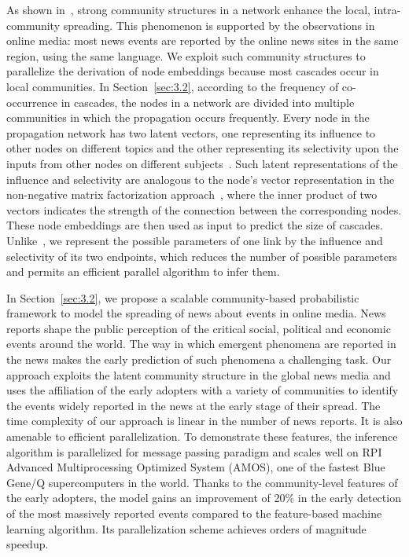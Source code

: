 As shown in~\cite{nematzadeh2014optimal}, strong community structures in a network enhance the local, intra-community spreading. This phenomenon is supported by the observations in online media: most news events are reported by the online news sites in the same region, using the same language. We exploit such community structures to parallelize the derivation of node embeddings because most cascades occur in local communities. In Section~\ref{sec:3.2}, according to the frequency of co-occurrence in cascades, the nodes in a network are divided into multiple communities in which the propagation occurs frequently. Every node in the propagation network has two latent vectors, one representing its influence to other nodes on different topics and the other representing its selectivity upon the inputs from other nodes on different subjects~\cite{bogdanov2014modeling}. Such latent representations of the influence and selectivity are analogous to the node's vector representation in the non-negative matrix factorization approach~\cite{lee2001algorithms,psorakis2011overlapping,yang2013overlapping}, where the inner product of two vectors indicates the strength of the connection between the corresponding nodes. These node embeddings are then used as input to predict the size of cascades. Unlike~\cite{gomez2013structure}, we represent the possible parameters of one link by the influence and selectivity of its two endpoints, which reduces the number of possible parameters and permits an efficient parallel algorithm to infer them. 

In Section~\ref{sec:3.2}, we propose a scalable community-based probabilistic framework to model the spreading of news about events in online media. News reports shape the public perception of the critical social, political and economic events around the world. The way in which emergent phenomena are reported in the news makes the early prediction of such phenomena a challenging task. Our approach exploits the latent community structure in the global news media and uses the affiliation of the early adopters with a variety of communities to identify the events widely reported in the news at the early stage of their spread. The time complexity of our approach is linear in the number of news reports. It is also amenable to efficient parallelization. To demonstrate these features, the inference algorithm is parallelized for message passing paradigm and scales well on RPI Advanced Multiprocessing Optimized System (AMOS), one of the fastest Blue Gene/Q supercomputers in the world. Thanks to the community-level features of the early adopters, the model gains an improvement of 20\% in the early detection of the most massively reported events compared to the feature-based machine learning algorithm. Its parallelization scheme achieves orders of magnitude speedup.

